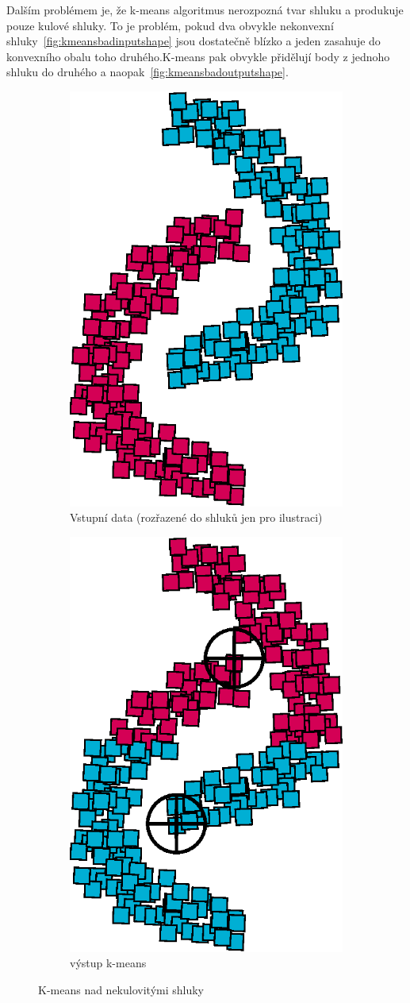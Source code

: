 Dalším problémem je, že k-means algoritmus nerozpozná tvar shluku a produkuje pouze kulové shluky. To je problém, pokud dva obvykle nekonvexní shluky~\autoref{fig:kmeansbadinputshape} jsou dostatečně blízko a jeden zasahuje do konvexního obalu toho druhého.K-means pak obvykle přidělují body z jednoho shluku do druhého a naopak~\autoref{fig:kmeansbadoutputshape}.
\begin{figure}[h]
\begin{subfigure}{.49\textwidth}
  \centering
  \includegraphics[width=.5\linewidth]{img/kmeans_badInputSampleShape.eps}
  \caption{Vstupní data (rozřazené do shluků jen pro ilustraci)}
  \label{fig:kmeansbadinputshape}
\end{subfigure}
\begin{subfigure}{.49\textwidth}
  \centering
  \includegraphics[width=.5\linewidth]{img/kmeans_badOutputSampleShape.eps}
  \caption{výstup k-means}
  \label{fig:kmeansbadoutputshape}
\end{subfigure}
\caption{K-means nad nekulovitými shluky}
\end{figure}

